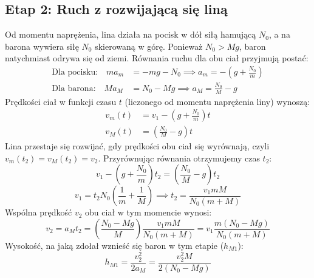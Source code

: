 \documentclass[a4paper,12pt]{article}
\begin{document}
\subsection*{Etap 2: Ruch z rozwijającą się liną}
Od momentu naprężenia, lina działa na pocisk w dół siłą hamującą $N_0$, a na barona wywiera siłę $N_0$ skierowaną w górę. Ponieważ $N_0 > Mg$, baron natychmiast odrywa się od ziemi.
Równania ruchu dla obu ciał przyjmują postać:
\begin{align}
\text{Dla pocisku:} \quad m a_m &= -mg - N_0 \implies a_m = -\left(g + \frac{N_0}{m}\right) \\
\text{Dla barona:} \quad M a_M &= N_0 - Mg \implies a_M = \frac{N_0}{M} - g
\end{align}
Prędkości ciał w funkcji czasu $t$ (liczonego od momentu naprężenia liny) wynoszą:
\begin{align}
v_m(t) &= v_1 - \left(g + \frac{N_0}{m}\right)t \\
v_M(t) &= \left(\frac{N_0}{M} - g\right)t
\end{align}
Lina przestaje się rozwijać, gdy prędkości obu ciał się wyrównają, czyli $v_m(t_2) = v_M(t_2) = v_2$. Przyrównując równania otrzymujemy czas $t_2$:
\begin{equation}
v_1 - \left(g + \frac{N_0}{m}\right)t_2 = \left(\frac{N_0}{M} - g\right)t_2
\end{equation}
\begin{equation}
v_1 = t_2 N_0 \left(\frac{1}{m} + \frac{1}{M}\right) \implies t_2 = \frac{v_1 mM}{N_0(m+M)}
\end{equation}
Wspólna prędkość $v_2$ obu ciał w tym momencie wynosi:
\begin{equation}
v_2 = a_M t_2 = \left(\frac{N_0 - Mg}{M}\right) \frac{v_1 mM}{N_0(m+M)} = v_1 \frac{m(N_0 - Mg)}{N_0(m+M)}
\end{equation}
Wysokość, na jaką zdołał wznieść się baron w tym etapie ($h_{M1}$):
\begin{equation}
h_{M1} = \frac{v_2^2}{2a_M} = \frac{v_2^2 M}{2(N_0 - Mg)}
\end{equation}
\end{document}
